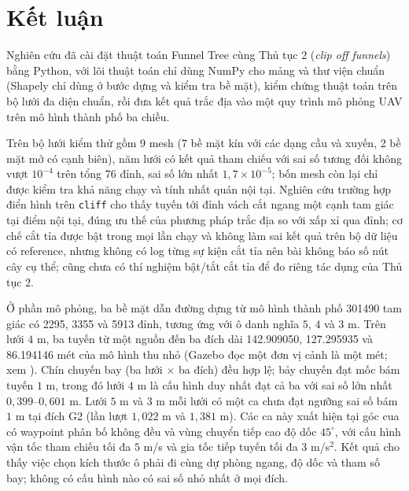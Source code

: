 
\section{Kết luận}\label{sec:concl}

Nghiên cứu đã cài đặt thuật toán Funnel Tree cùng Thủ tục 2 (\emph{clip off
funnels}) bằng Python, với lõi thuật toán chỉ dùng NumPy cho mảng và thư viện
chuẩn (Shapely chỉ dùng ở bước dựng và kiểm tra bề mặt), kiểm chứng thuật toán
trên bộ lưới đa diện chuẩn, rồi đưa kết quả trắc địa vào một quy trình mô phỏng
UAV trên mô hình thành phố ba chiều.

Trên bộ lưới kiểm thử gồm 9 mesh (7 bề mặt kín với các dạng cầu và xuyến, 2 bề mặt
mở có cạnh biên), năm lưới có kết quả tham chiếu với sai số tương đối không vượt
$10^{-4}$ trên tổng 76 đỉnh, sai số lớn nhất $1{,}7\times10^{-5}$; bốn mesh còn
lại chỉ được kiểm tra khả năng chạy và tính nhất quán nội tại. Nghiên cứu trường
hợp điển hình trên \texttt{cliff} cho thấy tuyến tới đỉnh vách cắt ngang một cạnh
tam giác tại điểm nội tại, đúng ưu thế của phương pháp trắc địa so với xấp xỉ qua
đỉnh; cơ chế cắt tỉa được bật trong mọi lần chạy và không làm sai kết quả trên bộ
dữ liệu có reference, nhưng không có log từng sự kiện cắt tỉa nên bài không báo số
nút cây cụ thể; cũng chưa có thí nghiệm bật/tắt cắt tỉa để đo riêng tác dụng của
Thủ tục 2.

Ở phần mô phỏng, ba bề mặt dẫn đường dựng từ mô hình thành phố \num{301490} tam
giác có \num{2295}, \num{3355} và \num{5913} đỉnh, tương ứng với ô danh nghĩa $5$,
$4$ và $3$ m. Trên lưới $4$ m, ba tuyến từ một nguồn đến ba đích dài
\num{142.909050}, \num{127.295935} và \num{86.194146} mét của mô hình thu nhỏ
(Gazebo đọc một đơn vị cảnh là một mét; xem ). Chín
chuyến bay (ba lưới $\times$ ba đích) đều hợp lệ; bảy chuyến đạt mốc bám tuyến
$1$ m, trong đó lưới $4$ m là cấu hình duy nhất đạt cả ba với sai số lớn nhất
$0{,}399$--$0{,}601$ m. Lưới $5$ m và $3$ m mỗi lưới có một ca chưa đạt ngưỡng
sai số bám $1$ m tại đích G2 (lần lượt $1{,}022$ m và
$1{,}381$ m). Các ca này xuất hiện tại góc cua có waypoint
phân bố không đều và vùng chuyển tiếp cao độ dốc $45^\circ$,
với cấu hình vận tốc tham chiếu tối đa $5$ m/s và gia tốc
tiếp tuyến tối đa $3$ m/s$^2$. Kết quả
cho thấy việc chọn kích thước ô phải đi cùng dự phòng ngang, độ dốc và tham số
bay; không có cấu hình nào có sai số nhỏ nhất ở mọi đích.

